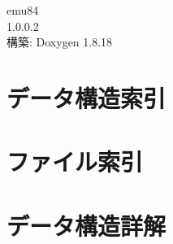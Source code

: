 \let\mypdfximage\pdfximage\def\pdfximage{\immediate\mypdfximage}\documentclass[twoside]{book}
\newcommand{\+}{\discretionary{\mbox{\scriptsize$\hookleftarrow$}}{}{}}
\newcommand{\clearemptydoublepage}{%
  \newpage{\pagestyle{empty}\cleardoublepage}%
}
\begin{document}
\begin{CJK}{UTF8}{min}

\hypersetup{pageanchor=false,
             bookmarksnumbered=true,
             pdfencoding=unicode
            }
\begin{titlepage}
\vspace*{7cm}
\begin{center}%
{\Large emu84 \\[1ex]\large 1.\+0.\+0.\+2 }\\
\vspace*{1cm}
{\large 構築\+: Doxygen 1.8.18}\\
\end{center}
\end{titlepage}
\clearemptydoublepage
{}
\tableofcontents
\clearemptydoublepage
{}
\hypersetup{pageanchor=true}

\chapter{データ構造索引}

\chapter{ファイル索引}

\chapter{データ構造詳解}





























\end{CJK}
\end{document}
